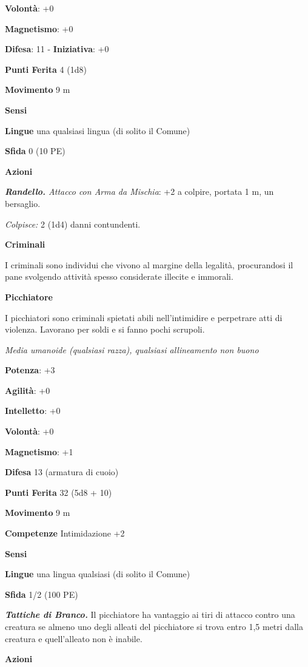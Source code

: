 \begin{multicols}{2}
\textbf{Volontà}: +0

\textbf{Magnetismo}: +0

\textbf{Difesa}: 11 - \textbf{Iniziativa}: +0

\textbf{Punti Ferita} 4 (1d8)

\textbf{Movimento} 9 m

\textbf{Sensi} 

\textbf{Lingue} una qualsiasi lingua (di solito il Comune)

\textbf{Sfida} 0 (10 PE)\smallskip

\smallskip\textbf{Azioni}

\emph{\textbf{Randello.} Attacco con Arma da Mischia}: +2 a colpire,
portata 1 m, un bersaglio.

\emph{Colpisce:} 2 (1d4) danni contundenti.

\textbf{Criminali}

I criminali sono individui che vivono al margine della legalità,
procurandosi il pane svolgendo attività spesso considerate illecite e
immorali.

\textbf{Picchiatore}

I picchiatori sono criminali spietati abili nell'intimidire e perpetrare
atti di violenza. Lavorano per soldi e si fanno pochi scrupoli.

\emph{Media umanoide (qualsiasi razza), qualsiasi allineamento non
buono}

\textbf{Potenza}: +3

\textbf{Agilità}: +0

\textbf{Intelletto}: +0

\textbf{Volontà}: +0

\textbf{Magnetismo}: +1

\textbf{Difesa} 13 (armatura di cuoio)

\textbf{Punti Ferita} 32 (5d8 + 10)

\textbf{Movimento} 9 m

\textbf{Competenze} Intimidazione +2

\textbf{Sensi} 

\textbf{Lingue} una lingua qualsiasi (di solito il Comune)

\textbf{Sfida} 1/2 (100 PE)\smallskip

\emph{\textbf{Tattiche di Branco.}} Il picchiatore ha vantaggio ai tiri
di attacco contro una creatura se almeno uno degli alleati del
picchiatore si trova entro 1,5 metri dalla creatura e quell'alleato non
è inabile.

\smallskip\textbf{Azioni}


\end{multicols}

